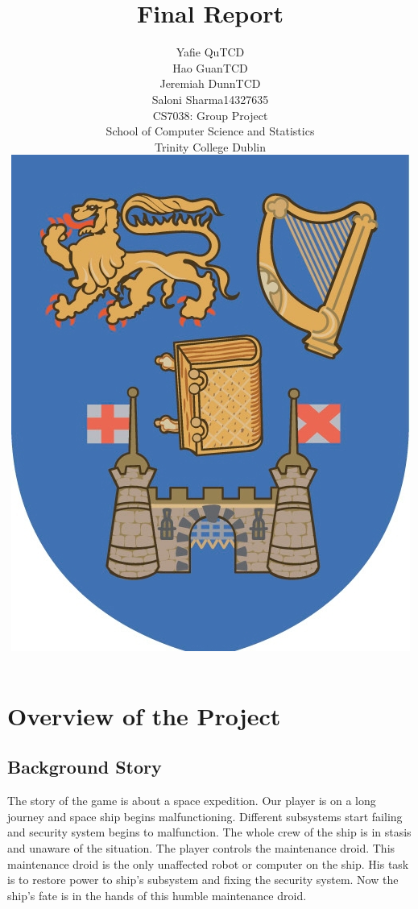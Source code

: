 \documentclass[11pt]{article}
\begin{document}
\title{Final Report}
\author{Yafie Qu\hspace{10 mm}TCD\\Hao Guan\hspace{10 mm}TCD\\Jeremiah Dunn\hspace{10 mm}TCD\\Saloni Sharma\hspace{10 mm}14327635\\CS7038: Group Project\\School of Computer Science and Statistics\\Trinity College Dublin\\\includegraphics[scale=1.5]{TCD.jpg}}
\maketitle
\section{Overview of the Project}
\subsection{Background Story}
The story of the game is about a space expedition. Our player is on a long journey and space ship begins malfunctioning. Different subsystems start failing and security system begins to malfunction. The whole crew of the ship is in stasis and unaware of the situation. The player controls the maintenance droid.  This maintenance droid is the only unaffected robot or computer on the ship. His task is to restore power to ship's subsystem and fixing the security system. Now the ship's fate is in the hands of this humble maintenance droid.
\end{document}
